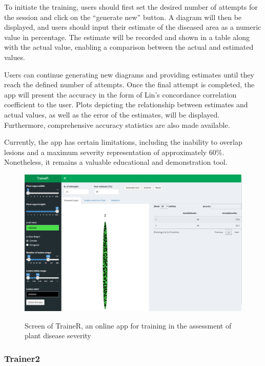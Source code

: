 \documentclass[
  letterpaper,
]{book}
\begin{document}
To initiate the training, users should first set the desired number of
attempts for the session and click on the ``generate new'' button. A
diagram will then be displayed, and users should input their estimate of
the diseased area as a numeric value in percentage. The estimate will be
recorded and shown in a table along with the actual value, enabling a
comparison between the actual and estimated values.

Users can continue generating new diagrams and providing estimates until
they reach the defined number of attempts. Once the final attempt is
completed, the app will present the accuracy in the form of Lin's
concordance correlation coefficient to the user. Plots depicting the
relationship between estimates and actual values, as well as the error
of the estimates, will be displayed. Furthermore, comprehensive accuracy
statistics are also made available.

Currently, the app has certain limitations, including the inability to
overlap lesions and a maximum severity representation of approximately
60\%. Nonetheless, it remains a valuable educational and demonstration
tool.

\begin{figure}

\href{https://edelponte.shinyapps.io/traineR/}{\includegraphics[width=4.47917in,height=\textheight]{imgs/trainer.png}}

\caption{\label{fig-trainer}Screen of TraineR, an online app for
training in the assessment of plant disease severity}

\end{figure}

\hypertarget{trainer2}{%
\subsubsection{Trainer2}\label{trainer2}}
\end{document}
